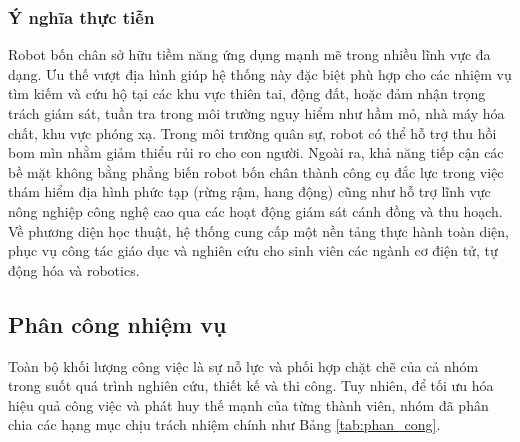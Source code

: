 \subsubsection*{Ý nghĩa thực tiễn}
Robot bốn chân sở hữu tiềm năng ứng dụng mạnh mẽ trong nhiều lĩnh vực đa dạng. Ưu thế vượt địa hình giúp hệ thống này đặc biệt phù hợp cho các nhiệm vụ tìm kiếm và cứu hộ tại các khu vực thiên tai, động đất, hoặc đảm nhận trọng trách giám sát, tuần tra trong môi trường nguy hiểm như hầm mỏ, nhà máy hóa chất, khu vực phóng xạ. Trong môi trường quân sự, robot có thể hỗ trợ thu hồi bom mìn nhằm giảm thiểu rủi ro cho con người. Ngoài ra, khả năng tiếp cận các bề mặt không bằng phẳng biến robot bốn chân thành công cụ đắc lực trong việc thám hiểm địa hình phức tạp (rừng rậm, hang động) cũng như hỗ trợ lĩnh vực nông nghiệp công nghệ cao qua các hoạt động giám sát cánh đồng và thu hoạch. Về phương diện học thuật, hệ thống cung cấp một nền tảng thực hành toàn diện, phục vụ công tác giáo dục và nghiên cứu cho sinh viên các ngành cơ điện tử, tự động hóa và robotics.

\subsection{Phân công nhiệm vụ}

Toàn bộ khối lượng công việc là sự nỗ lực và phối hợp chặt chẽ của cả nhóm trong suốt quá trình nghiên cứu, thiết kế và thi công. Tuy nhiên, để tối ưu hóa hiệu quả công việc và phát huy thế mạnh của từng thành viên, nhóm đã phân chia các hạng mục chịu trách nhiệm chính như Bảng \ref{tab:phan_cong}.

